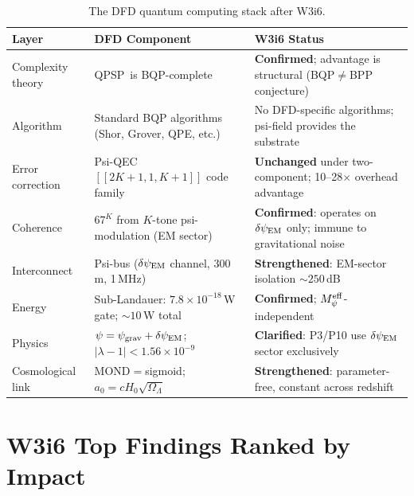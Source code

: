 \documentclass[11pt]{article}
\theoremstyle{definition}
\theoremstyle{remark}
\newcommand{\ee}[1]{\times 10^{#1}}
\newcommand{\lamdiff}{|\lambda-1|}
\newcommand{\QPSP}{\textsc{QPSP}}
\newcommand{\Meff}{M_\psi^{\rm eff}}
\newcommand{\psigrav}{\psi_{\rm grav}}
\newcommand{\dpsiEM}{\delta\psi_{\rm EM}}
\begin{document}
\begin{table}[h]
\centering
\caption{The DFD quantum computing stack after W3i6.}
\label{tab:stack}
\begin{tabular}{@{}p{3cm}p{4.5cm}p{4.5cm}@{}}
\toprule
Layer & DFD Component & W3i6 Status \\
\midrule
Complexity theory & \QPSP\ is BQP-complete & \textbf{Confirmed};
  advantage is structural (BQP$\neq$BPP conjecture) \\
\addlinespace
Algorithm & Standard BQP algorithms (Shor, Grover, QPE, etc.) &
  No DFD-specific algorithms; psi-field provides the substrate \\
\addlinespace
Error correction & Psi-QEC $[[2K+1,1,K+1]]$ code family &
  \textbf{Unchanged} under two-component; 10--28$\times$ overhead
  advantage \\
\addlinespace
Coherence & $67^K$ from $K$-tone psi-modulation (EM sector) &
  \textbf{Confirmed}: operates on $\dpsiEM$ only; immune to
  gravitational noise \\
\addlinespace
Interconnect & Psi-bus ($\dpsiEM$ channel, 300\,m, 1\,MHz) &
  \textbf{Strengthened}: EM-sector isolation $\sim 250$\,dB \\
\addlinespace
Energy & Sub-Landauer: $7.8\ee{-18}$\,W gate; $\sim 10$\,W total &
  \textbf{Confirmed}; $\Meff$-independent \\
\addlinespace
Physics & $\psi = \psigrav + \dpsiEM$; $\lamdiff < 1.56\ee{-9}$ &
  \textbf{Clarified}: P3/P10 use $\dpsiEM$ sector exclusively \\
\addlinespace
Cosmological link & MOND$=$sigmoid; $a_0 = cH_0\sqrt{\Omega_\Lambda}$ &
  \textbf{Strengthened}: parameter-free, constant across redshift \\
\bottomrule
\end{tabular}
\end{table}

\section{W3i6 Top Findings Ranked by Impact}
\label{sec:top-findings}
\end{document}
